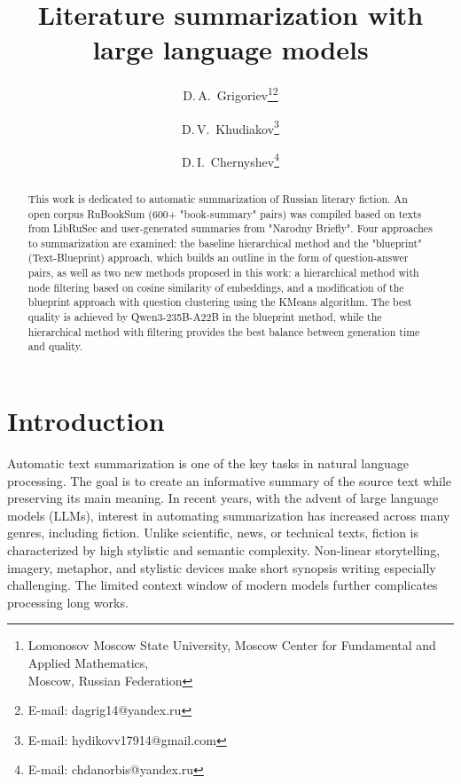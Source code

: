 \documentclass{superfri}
\begin{document}
\raggedbottom
\author{D.\,A.~Grigoriev\footnote{\label{msu}Lomonosov Moscow State University, Moscow Center for Fundamental and Applied Mathematics, \\ Moscow, Russian Federation}\footnote{E-mail: dagrig14@yandex.ru} \and D.\,V.~Khudiakov\footnote{E-mail: hydikovv17914@gmail.com} \and D.\,I.~Chernyshev\footnote{E-mail: chdanorbis@yandex.ru}}

\title{Literature summarization with large language models}

\maketitle{}

\begin{abstract}
This work is dedicated to automatic summarization of Russian literary fiction.
An open corpus RuBookSum (600+ "book-summary" pairs) was compiled based on texts from LibRuSec and user-generated summaries from "Narodny Briefly".
Four approaches to summarization are examined: the baseline hierarchical method and the "blueprint" (Text-Blueprint) approach, 
which builds an outline in the form of question-answer pairs, as well as two new methods proposed in this work: 
a hierarchical method with node filtering based on cosine similarity of embeddings, 
and a modification of the blueprint approach with question clustering using the KMeans algorithm.
The best quality is achieved by Qwen3-235B-A22B in the blueprint method, 
while the hierarchical method with filtering provides the best balance between generation time and quality.
\end{abstract}



\section*{Introduction}
Automatic text summarization is one of the key tasks in natural language processing. The goal is to create an informative summary of the source text while preserving its main meaning.
In recent years, with the advent of large language models (LLMs), interest in automating summarization has increased across many genres, including fiction.
Unlike scientific, news, or technical texts, fiction is characterized by high stylistic and semantic complexity.
Non-linear storytelling, imagery, metaphor, and stylistic devices make short synopsis writing especially challenging.
The limited context window of modern models further complicates processing long works.
\end{document}
